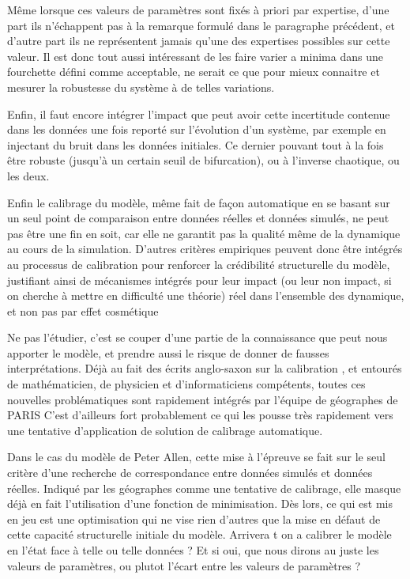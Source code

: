 Même lorsque ces valeurs de paramètres sont fixés à priori par expertise, d'une part ils n'échappent pas à la remarque formulé dans le paragraphe précédent, et d'autre part ils ne représentent jamais qu'une des expertises possibles sur cette valeur. Il est donc tout aussi intéressant de les faire varier a minima dans une fourchette défini comme acceptable, ne serait ce que pour mieux connaitre et mesurer la robustesse du système à de telles variations.

Enfin, il faut encore intégrer l'impact que peut avoir cette incertitude contenue dans les données une fois reporté sur l'évolution d'un système, par exemple en injectant du bruit dans les données initiales. Ce dernier pouvant tout à la fois être robuste (jusqu'à un certain seuil de bifurcation), ou à l'inverse chaotique, ou les deux.

Enfin le calibrage du modèle, même fait de façon automatique en se basant sur un seul point de comparaison entre données réelles et données simulés, ne peut pas être une fin en soit, car elle ne garantit pas la qualité même de la dynamique au cours de la simulation. D'autres critères empiriques peuvent donc être intégrés au processus de calibration pour renforcer la crédibilité structurelle du modèle, justifiant ainsi de mécanismes intégrés pour leur impact (ou leur non impact, si on cherche à mettre en difficulté une théorie) réel dans l'ensemble des dynamique, et non pas par effet cosmétique \autocites{Hermann1967, Grimm2005,Cottineau2014b}

Ne pas l'étudier, c'est se couper d'une partie de la connaissance que peut nous apporter le modèle, et prendre aussi le risque de donner de fausses interprétations. Déjà au fait des écrits anglo-saxon sur la calibration \autocite{Batty1976}, et entourés de mathématicien, de physicien et d'informaticiens compétents, toutes ces nouvelles problématiques sont rapidement intégrés par l'équipe de géographes de PARIS \autocites{Sanders1984, Sanders1985, Pumain1989} C'est d'ailleurs fort probablement ce qui les pousse très rapidement vers une tentative d'application de solution de calibrage automatique.

Dans le cas du modèle de Peter Allen, cette mise à l'épreuve se fait sur le seul critère d'une recherche de correspondance entre données simulés et données réelles. Indiqué par les géographes comme une tentative de calibrage, elle masque déjà en fait l'utilisation d'une fonction de minimisation. Dès lors, ce qui est mis en jeu est une optimisation qui ne vise rien d'autres que la mise en défaut de cette capacité structurelle initiale du modèle. Arrivera t on a calibrer le modèle en l'état face à telle ou telle données ? Et si oui, que nous dirons au juste les valeurs de paramètres, ou plutot l'écart entre les valeurs de paramètres ?

